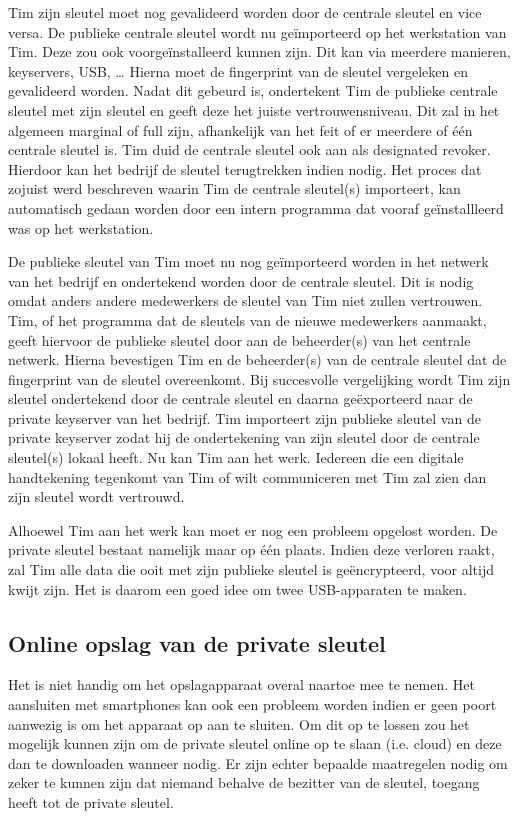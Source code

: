Tim zijn sleutel moet nog gevalideerd worden door de centrale sleutel en vice
versa. De publieke centrale sleutel wordt nu geïmporteerd op het werkstation van
Tim. Deze zou ook voorgeïnstalleerd kunnen zijn. Dit kan via meerdere manieren,
keyservers, USB, … Hierna moet de fingerprint van de sleutel vergeleken en
gevalideerd worden. Nadat dit gebeurd is, ondertekent Tim de publieke centrale
sleutel met zijn sleutel en geeft deze het juiste vertrouwensniveau. Dit zal in
het algemeen marginal of full zijn, afhankelijk van het feit of er meerdere of
één centrale sleutel is. Tim duid de centrale sleutel ook aan als designated
revoker. Hierdoor kan het bedrijf de sleutel terugtrekken indien nodig. Het
proces dat zojuist werd beschreven waarin Tim de centrale sleutel(s) importeert,
kan automatisch gedaan worden door een intern programma dat vooraf
geïnstallleerd was op het werkstation.

De publieke sleutel van Tim moet nu nog geïmporteerd worden in het netwerk van
het bedrijf en ondertekend worden door de centrale sleutel. Dit is nodig omdat
anders andere medewerkers de sleutel van Tim niet zullen vertrouwen. Tim, of het
programma dat de sleutels van de nieuwe medewerkers aanmaakt, geeft hiervoor de
publieke sleutel door aan de beheerder(s) van het centrale netwerk. Hierna
bevestigen Tim en de beheerder(s) van de centrale sleutel dat de fingerprint van
de sleutel overeenkomt. Bij succesvolle vergelijking wordt Tim zijn sleutel
ondertekend door de centrale sleutel en daarna geëxporteerd naar de private
keyserver van het bedrijf. Tim importeert zijn publieke sleutel van de private
keyserver zodat hij de ondertekening van zijn sleutel door de centrale
sleutel(s) lokaal heeft. Nu kan Tim aan het werk. Iedereen die een digitale
handtekening tegenkomt van Tim of wilt communiceren met Tim zal zien dan zijn
sleutel wordt vertrouwd.

Alhoewel Tim aan het werk kan moet er nog een probleem opgelost worden. De
private sleutel bestaat namelijk maar op één plaats. Indien deze verloren raakt,
zal Tim alle data die ooit met zijn publieke sleutel is geëncrypteerd, voor
altijd kwijt zijn. Het is daarom een goed idee om twee USB-apparaten te maken.

\subsection{Online opslag van de private sleutel}
\label{subsec:online-opslag-van-de-private-sleutel}

Het is niet handig om het opslagapparaat overal naartoe mee te nemen. Het
aansluiten met smartphones kan ook een probleem worden indien er geen poort
aanwezig is om het apparaat op aan te sluiten. Om dit op te lossen zou het
mogelijk kunnen zijn om de private sleutel online op te slaan (i.e. cloud) en
deze dan te downloaden wanneer nodig. Er zijn echter bepaalde maatregelen nodig
om zeker te kunnen zijn dat niemand behalve de bezitter van de sleutel, toegang
heeft tot de private sleutel.

